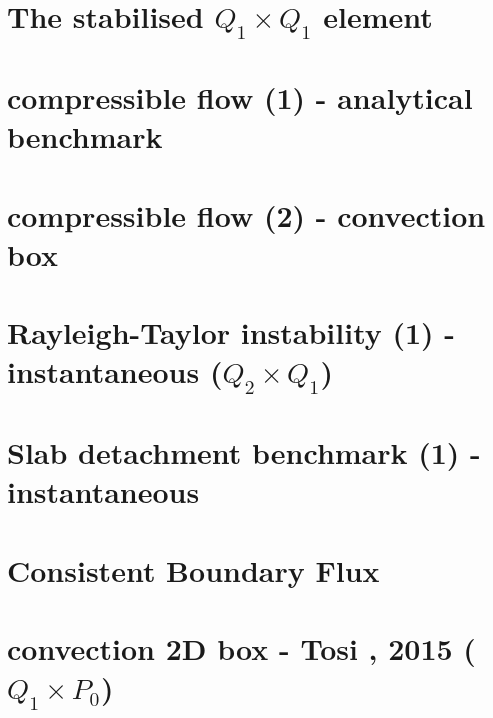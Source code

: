 \documentclass[a4paper,11pt]{report}
\begin{document}
\chapter{The stabilised $Q_1 \times Q_1$ element \label{f22}} %

\chapter{compressible flow (1) - analytical benchmark \label{f23}} %

\chapter{compressible flow (2) - convection box \label{f24}} %

\chapter{Rayleigh-Taylor instability (1) - instantaneous ($Q_2\times Q_1$)\label{f25}} %

\chapter{Slab detachment benchmark (1) - instantaneous \label{f26}} %

\chapter{Consistent Boundary Flux \label{f27}} %

\chapter{convection 2D box - Tosi \etal, 2015 ($Q_1\times P_0$) \label{f28}} %
\end{document}
